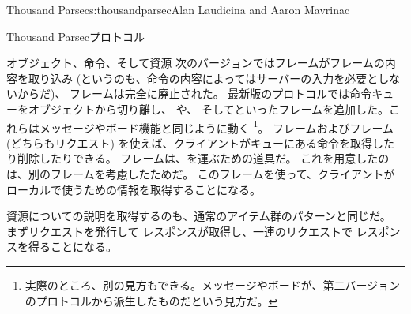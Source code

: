 \begin{aosachapter}{Thousand Parsec}{s:thousandparsec}{Alan Laudicina and Aaron Mavrinac}
\begin{aosasect1}{Thousand Parsecプロトコル}
\begin{aosasect2}{オブジェクト、命令、そして資源}
次のバージョンではフレームがフレームの内容を取り込み
(というのも、命令の内容によってはサーバーの入力を必要としないからだ)、
フレームは完全に廃止された。
最新版のプロトコルでは命令キューをオブジェクトから切り離し、
や、
そしてといったフレームを追加した。これらはメッセージやボード機能と同じように動く
\footnote{実際のところ、別の見方もできる。メッセージやボードが、第二バージョンのプロトコルから派生したものだという見方だ。}。
フレームおよびフレーム(どちらもリクエスト)
を使えば、クライアントがキューにある命令を取得したり削除したりできる。
フレームは、を運ぶための道具だ。
これを用意したのは、別のフレームを考慮したためだ。
このフレームを使って、クライアントがローカルで使うための情報を取得することになる。

資源についての説明を取得するのも、通常のアイテム群のパターンと同じだ。
まずリクエストを発行して
レスポンスが取得し、一連のリクエストで
レスポンスを得ることになる。


\end{aosasect2}
\end{aosasect1}
\end{aosachapter}
